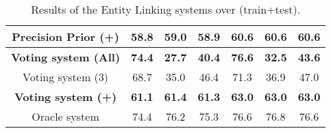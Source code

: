 \begin{table}[h!]
{\begin{tabular}{|c|ccc|ccc|}
    Precision Prior (+)              & 58.8                                 & 59.0                                    & 58.9              & 60.6                                 & 60.6                                    & 60.6              \\ \hline
    \textbf{Voting system (All)}     & \textbf{74.4}                        & \textbf{27.7}                           & \textbf{40.4}     & \textbf{76.6}                        & \textbf{32.5}                           & \textbf{43.6}     \\
    Voting system (3)                & 68.7                                 & 35.0                                    & 46.4              & 71.3                                 & 36.9                                    & 47.0              \\
    \textbf{Voting system (+)}       & \textbf{61.1}                        & \textbf{61.4}                           & \textbf{61.3}     & \textbf{63.0}                        & \textbf{63.0}                           & \textbf{63.0}     \\ \hline
    Oracle system                    & 74.4                                 & 76.2                                    & 75.3              & 76.6                                 & 76.8                                    & 76.6              \\ \hline
    \end{tabular}%
    }
    \caption{ Results of the Entity Linking systems over \QALDseven{} (train+test).}
    \label{table:elResultsQald7}
\end{table}

